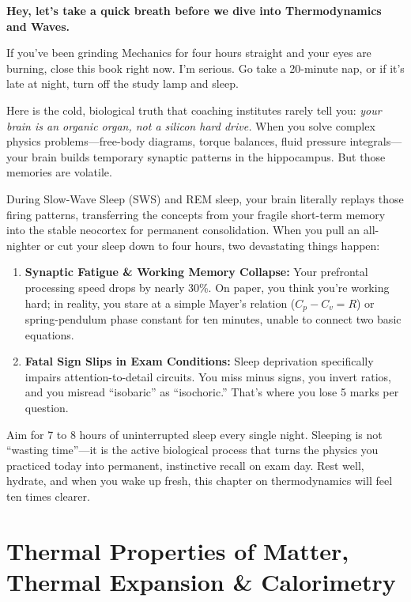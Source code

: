 \documentclass[10pt,twoside,openright]{book}
\begin{document}
\begin{mentorbox}
\textbf{Hey, let's take a quick breath before we dive into Thermodynamics and Waves.}

If you've been grinding Mechanics for four hours straight and your eyes are burning, close this book right now. I'm serious. Go take a 20-minute nap, or if it's late at night, turn off the study lamp and sleep.

Here is the cold, biological truth that coaching institutes rarely tell you: \textit{your brain is an organic organ, not a silicon hard drive.} When you solve complex physics problems---free-body diagrams, torque balances, fluid pressure integrals---your brain builds temporary synaptic patterns in the hippocampus. But those memories are volatile. 

During Slow-Wave Sleep (SWS) and REM sleep, your brain literally replays those firing patterns, transferring the concepts from your fragile short-term memory into the stable neocortex for permanent consolidation. When you pull an all-nighter or cut your sleep down to four hours, two devastating things happen:
\begin{enumerate}[leftmargin=*]
  \item \textbf{Synaptic Fatigue \& Working Memory Collapse:} Your prefrontal processing speed drops by nearly 30\%. On paper, you think you're working hard; in reality, you stare at a simple Mayer's relation ($C_p - C_v = R$) or spring-pendulum phase constant for ten minutes, unable to connect two basic equations.
  \item \textbf{Fatal Sign Slips in Exam Conditions:} Sleep deprivation specifically impairs attention-to-detail circuits. You miss minus signs, you invert ratios, and you misread ``isobaric'' as ``isochoric.'' That's where you lose 5 marks per question.
\end{enumerate}

Aim for 7 to 8 hours of uninterrupted sleep every single night. Sleeping is not ``wasting time''---it is the active biological process that turns the physics you practiced today into permanent, instinctive recall on exam day. Rest well, hydrate, and when you wake up fresh, this chapter on thermodynamics will feel ten times clearer.
\end{mentorbox}

\section{Thermal Properties of Matter, Thermal Expansion \& Calorimetry}
\end{document}
